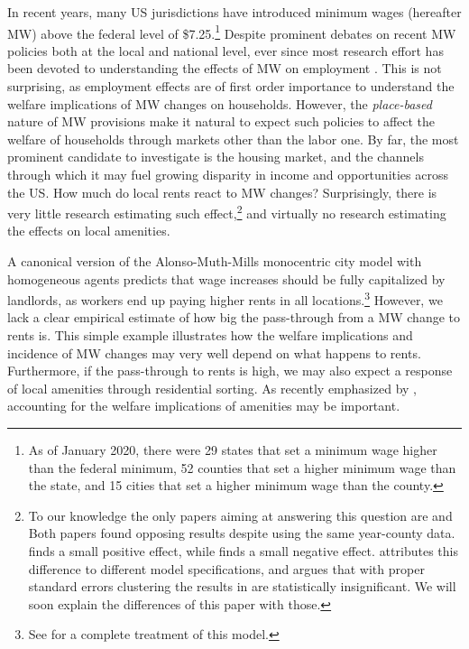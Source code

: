 
In recent years, many US jurisdictions have introduced minimum wages (hereafter MW) above the 
federal level of \$7.25.\footnote{As of January 2020, there were 29 states that set a minimum 
	wage higher than the federal minimum, 52 counties that set a higher minimum wage than the 
	state, and 15 cities that set a higher minimum wage than the county.}
Despite prominent debates on recent MW policies both at the local and national level, ever since 
\textcite{card2000minimum} most research effort has been devoted to understanding the effects of 
MW on employment \parencite{neumark2006minimum, dube2010minimum, dube2016minimum}. This is not 
surprising, as employment effects are of first order importance to understand the welfare 
implications of MW changes on households. However, the \textit{place-based} nature of MW provisions 
make it natural to expect such policies to affect the welfare of households through markets other 
than the labor one. By far, the most prominent candidate to investigate is the housing market, and 
the channels through which it may fuel growing disparity in income and opportunities across the US. 
How much do local rents react to MW changes? Surprisingly, there is very little research estimating 
such effect,\footnote{To our knowledge the only papers aiming at answering this question are 
	\textcite{yamagishi2019minimum} and \textcite{tidemann2018mw} Both papers found opposing results 
	despite using the same year-county data. \textcite{yamagishi2019minimum} finds a small positive 
	effect, while \textcite{tidemann2018mw} finds a small negative effect. 
	\textcite{yamagishi2019minimum} attributes this difference to different model specifications, 
	and argues that with proper standard errors clustering the results in \textcite{tidemann2018mw} 
	are statistically insignificant. We will soon explain the differences of this paper with those.}
and virtually no research estimating the effects on local amenities.

A canonical version of the Alonso-Muth-Mills monocentric city  model with homogeneous agents 
predicts that wage increases should be fully capitalized by landlords, as workers end up paying 
higher rents in all locations.\footnote{See \textcite{brueckner1987structure} for a complete treatment 
	of this model.} 
However, we lack a clear empirical estimate of how big the pass-through from a MW change to 
rents is. This simple example illustrates how the welfare implications and incidence of MW changes
may very well depend on what happens to rents. Furthermore, if the pass-through to rents is high, 
we may also expect a response of local amenities through residential sorting. As recently emphasized
by \textcite{diamond2016determinants}, accounting for the welfare implications of amenities may be 
important.
 
